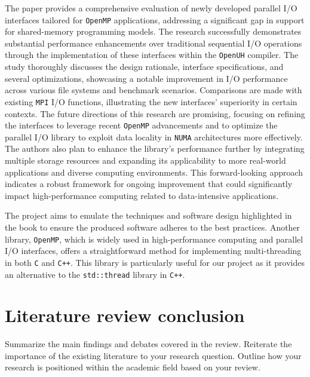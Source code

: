 The paper\cite{openmp_usage_hpc} provides a comprehensive evaluation of newly developed parallel I/O interfaces tailored for \texttt{OpenMP} applications, addressing a significant gap in support for shared-memory programming models. The research successfully demonstrates substantial performance enhancements over traditional sequential I/O operations through the implementation of these interfaces within the \texttt{OpenUH} compiler. The study thoroughly discusses the design rationale, interface specifications, and several optimizations, showcasing a notable improvement in I/O performance across various file systems and benchmark scenarios. Comparisons are made with existing \texttt{MPI} I/O functions, illustrating the new interfaces' superiority in certain contexts. The future directions of this research are promising, focusing on refining the interfaces to leverage recent \texttt{OpenMP} advancements and to optimize the parallel I/O library to exploit data locality in \texttt{NUMA} architectures more effectively. The authors also plan to enhance the library's performance further by integrating multiple storage resources and expanding its applicability to more real-world applications and diverse computing environments. This forward-looking approach indicates a robust framework for ongoing improvement that could significantly impact high-performance computing related to data-intensive applications.

The project aims to emulate the techniques and software design highlighted in the book\cite{c++_concurrency_in_action} to ensure the produced software adheres to the best practices. Another library, \texttt{OpenMP}, which is widely used in high-performance computing and parallel I/O interfaces\cite{openmp_usage_hpc}, offers a straightforward method for implementing multi-threading in both \texttt{C} and \texttt{C++}. This library is particularly useful for our project as it provides an alternative to the \texttt{std::thread} library in \texttt{C++}. 

\section{Literature review conclusion}
Summarize the main findings and debates covered in the review.
Reiterate the importance of the existing literature to your research question.
Outline how your research is positioned within the academic field based on your review.

